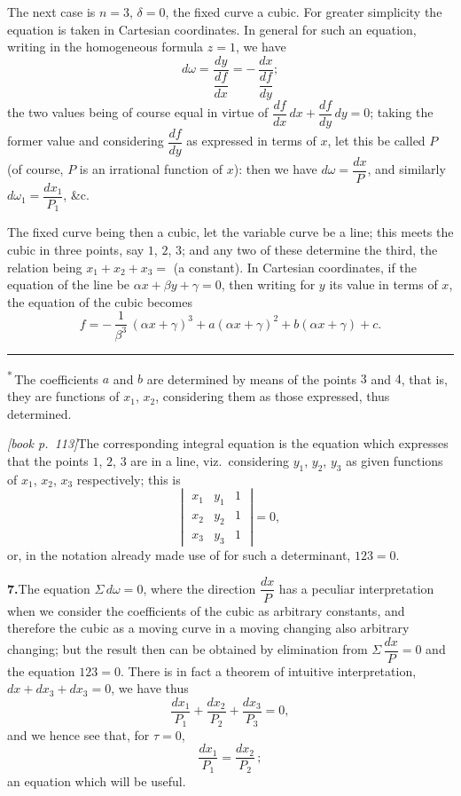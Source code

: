 \documentclass[11pt,a4paper]{article}
\theoremstyle{plain}
\theoremstyle{definition}
\theoremstyle{remark}
\begin{document}
The next case is $n = 3$, $\delta = 0$, the fixed curve a cubic. For greater simplicity the equation is taken in Cartesian coordinates. In general for such an equation, writing in the homogeneous formula $z = 1$, we have
\[
d\omega = \frac{dy}{\dfrac{df}{dx}} = -\,\frac{dx}{\dfrac{df}{dy}};
\]
the two values being of course equal in virtue of $\dfrac{df}{dx}\,dx + \dfrac{df}{dy}\,dy = 0$; taking the former value and considering $\dfrac{df}{dy}$ as expressed in terms of $x$, let this be called $P$ (of course, $P$ is an irrational function of $x$): then we have $d\omega = \dfrac{dx}{P}$, and similarly $d\omega_1 = \dfrac{dx_1}{P_1}$, \&c.

The fixed curve being then a cubic, let the variable curve be a line; this meets the cubic in three points, say $1$, $2$, $3$; and any two of these determine the third, the relation being $x_1 + x_2 + x_3 = $ (a constant). In Cartesian coordinates, if the equation of the line be $\alpha x + \beta y + \gamma = 0$, then writing for $y$ its value in terms of $x$, the equation of the cubic becomes
\[
f = -\,\frac{1}{\beta^3}\,(\alpha x + \gamma)^3 + a(\alpha x + \gamma)^2 + b(\alpha x + \gamma) + c.
\]

\bigskip

\hrule
\smallskip
\noindent\textsuperscript{*}\,The coefficients $a$ and $b$ are determined by means of the points $3$ and $4$, that is, they are functions of $x_1$, $x_2$, considering them as those expressed, thus determined.

\noindent\textit{[book p.~113]}\quad The corresponding integral equation is the equation which expresses that the points $1$, $2$, $3$ are in a line, viz.\ considering $y_1$, $y_2$, $y_3$ as given functions of $x_1$, $x_2$, $x_3$ respectively; this is
\[
\left|\;\begin{array}{ccc}
x_1 & y_1 & 1 \\
x_2 & y_2 & 1 \\
x_3 & y_3 & 1
\end{array}\;\right| = 0,
\]
or, in the notation already made use of for such a determinant, $123 = 0$.

\medskip\noindent\textbf{7.}\quad The equation $\Sigma\,d\omega = 0$, where the direction $\dfrac{dx}{P}$ has a peculiar interpretation when we consider the coefficients of the cubic as arbitrary constants, and therefore the cubic as a moving curve in a moving changing also arbitrary changing; but the result then can be obtained by elimination from $\Sigma\,\dfrac{dx}{P} = 0$ and the equation $123 = 0$. There is in fact a theorem of intuitive interpretation, $dx + dx_3 + dx_3 = 0$, we have thus
\[
\frac{dx_1}{P_1} + \frac{dx_2}{P_2} + \frac{dx_3}{P_3} = 0,
\]
and we hence see that, for $\tau = 0$,
\[
\frac{dx_1}{P_1} = \frac{dx_2}{P_2}\,;
\]
an equation which will be useful.
\end{document}

